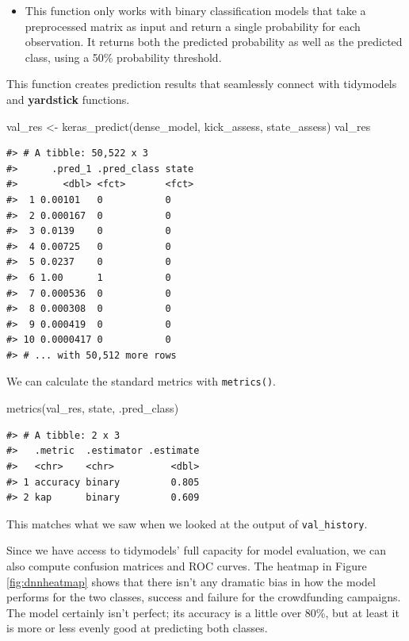 \documentclass[
]{krantz}
\makeatletter
\newenvironment{Shaded}{\begin{snugshade}}{\end{snugshade}}
\newcommand{\FunctionTok}[1]{\textcolor[rgb]{0.00,0.00,0.00}{#1}}
\newcommand{\NormalTok}[1]{#1}
\newcommand{\OtherTok}[1]{\textcolor[rgb]{0.56,0.35,0.01}{#1}}
\newenvironment{kframe}{%
\medskip{}
\setlength{\fboxsep}{.8em}
 \def\at@end@of@kframe{}%
 \ifinner\ifhmode%
  \def\at@end@of@kframe{\end{minipage}}%
  \begin{minipage}{\columnwidth}%
 \fi\fi%
 \def\FrameCommand##1{\hskip\@totalleftmargin \hskip-\fboxsep
 \colorbox{shadecolor}{##1}\hskip-\fboxsep
     \hskip-\linewidth \hskip-\@totalleftmargin \hskip\columnwidth}%
 \MakeFramed {\advance\hsize-\width
   \@totalleftmargin\z@ \linewidth\hsize
   \@setminipage}}%
 {\par\unskip\endMakeFramed%
 \at@end@of@kframe}
\renewenvironment{Shaded}{\begin{kframe}}{\end{kframe}}
\newenvironment{rmdblock}[1]
  {\begin{shaded*}
  \begin{itemize}[left = -1cm, labelsep = 1cm]
  \renewcommand{\labelitemi}{
    \raisebox{-.7\height}[0pt][0pt]{
      {\setkeys{Gin}{width=3em,keepaspectratio}\texttt{[image: images/\#1]}}
    }
  }
 
  \item
  }
  {
  \end{itemize}
  \end{shaded*}
  }
\newenvironment{rmdwarning}
  {\begin{rmdblock}{warning}}
  {\end{rmdblock}}
\makeatother
\begin{document}
\begin{rmdwarning}
This function only works with binary classification models that take a
preprocessed matrix as input and return a single probability for each
observation. It returns both the predicted probability as well as the
predicted class, using a 50\% probability threshold.
\end{rmdwarning}

This function creates prediction results that seamlessly connect with tidymodels and \textbf{yardstick} functions.

\begin{Shaded}
\begin{Highlighting}[]
\NormalTok{val\_res }\OtherTok{\textless{}{-}} \FunctionTok{keras\_predict}\NormalTok{(dense\_model, kick\_assess, state\_assess)}
\NormalTok{val\_res}
\end{Highlighting}
\end{Shaded}

\begin{verbatim}
#> # A tibble: 50,522 x 3
#>      .pred_1 .pred_class state
#>        <dbl> <fct>       <fct>
#>  1 0.00101   0           0    
#>  2 0.000167  0           0    
#>  3 0.0139    0           0    
#>  4 0.00725   0           0    
#>  5 0.0237    0           0    
#>  6 1.00      1           0    
#>  7 0.000536  0           0    
#>  8 0.000308  0           0    
#>  9 0.000419  0           0    
#> 10 0.0000417 0           0    
#> # ... with 50,512 more rows
\end{verbatim}

We can calculate the standard metrics with \texttt{metrics()}.

\begin{Shaded}
\begin{Highlighting}[]
\FunctionTok{metrics}\NormalTok{(val\_res, state, .pred\_class)}
\end{Highlighting}
\end{Shaded}

\begin{verbatim}
#> # A tibble: 2 x 3
#>   .metric  .estimator .estimate
#>   <chr>    <chr>          <dbl>
#> 1 accuracy binary         0.805
#> 2 kap      binary         0.609
\end{verbatim}

This matches what we saw when we looked at the output of \texttt{val\_history}.

Since we have access to tidymodels' full capacity for model evaluation, we can also compute confusion matrices and ROC curves.
The heatmap in Figure \ref{fig:dnnheatmap} shows that there isn't any dramatic bias in how the model performs for the two classes, success and failure for the crowdfunding campaigns. The model certainly isn't perfect; its accuracy is a little over 80\%, but at least it is more or less evenly good at predicting both classes.
\end{document}
